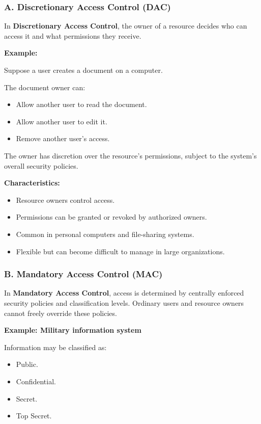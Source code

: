 \subsubsection{A. Discretionary Access Control (DAC)}

In \textbf{Discretionary Access Control}, the owner of a resource decides who can access it and what permissions they receive.

\textbf{Example:}

Suppose a user creates a document on a computer.

The document owner can:

\begin{itemize}
\item Allow another user to read the document.
\item Allow another user to edit it.
\item Remove another user's access.
\end{itemize}

The owner has discretion over the resource's permissions, subject to the system's overall security policies.

\textbf{Characteristics:}

\begin{itemize}
\item Resource owners control access.
\item Permissions can be granted or revoked by authorized owners.
\item Common in personal computers and file-sharing systems.
\item Flexible but can become difficult to manage in large organizations.
\end{itemize}

\subsubsection{B. Mandatory Access Control (MAC)}

In \textbf{Mandatory Access Control}, access is determined by centrally enforced security policies and classification levels. Ordinary users and resource owners cannot freely override these policies.

\textbf{Example: Military information system}

Information may be classified as:

\begin{itemize}
\item Public.
\item Confidential.
\item Secret.
\item Top Secret.
\end{itemize}

